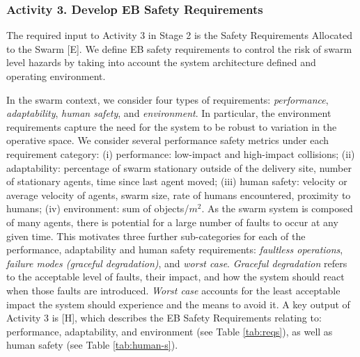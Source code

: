 \documentclass[runningheads]{llncs}
\begin{document}
\subsubsection*{Activity 3. Develop EB Safety Requirements}

The required input to Activity 3 in Stage 2 is the Safety Requirements Allocated to the Swarm [E]. 
We define EB safety requirements to control the risk of swarm level hazards by taking into account the system architecture defined and operating environment. 

In the swarm context, we consider four types of requirements: \emph{performance}, \emph{adaptability}, \emph{human safety}, and \emph{environment}. 
In particular, the environment requirements capture the need for the system to be robust to variation in the operative space.
We consider several performance safety metrics under each requirement category: 
(i) performance: low-impact and high-impact collisions; 
(ii) adaptability: percentage of swarm stationary outside of the delivery site, number of stationary agents, time since last agent moved; 
(iii) human safety: velocity or average velocity of agents, swarm size, rate of humans encountered, proximity to humans;
(iv) environment: sum of objects/$m^2$.
As the swarm system is composed of many agents, there is potential for a large number of faults to occur at any given time. This motivates three further sub-categories for each of the performance, adaptability and human safety requirements: \emph{faultless operations}, \emph{failure modes (graceful degradation)}, and \emph{worst case}. 
\emph{Graceful degradation} refers to the acceptable level of faults, their impact, and how the system should react when those faults are introduced. \emph{Worst case} accounts for the least acceptable impact the system should experience and the means to avoid it. 
A key output of Activity 3 is [H], which describes the EB Safety Requirements relating to: performance, adaptability, and environment (see Table \ref{tab:reqs}), as well as human safety (see Table \ref{tab:human-s}).
\end{document}
